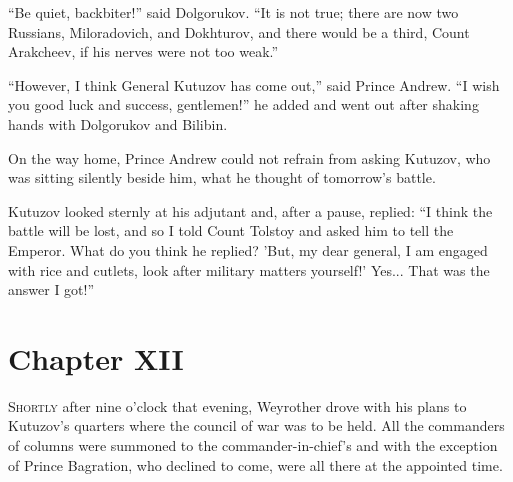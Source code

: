 ``Be quiet, backbiter!'' said Dolgorukov. ``It is not true; there
are now two Russians, Miloradovich, and Dokhturov, and there
would be a third, Count Arakcheev, if his nerves were not too
weak.''

``However, I think General Kutuzov has come out,'' said Prince
Andrew. ``I wish you good luck and success, gentlemen!'' he added
and went out after shaking hands with Dolgorukov and Bilibin.

On the way home, Prince Andrew could not refrain from asking
Kutuzov, who was sitting silently beside him, what he thought of
tomorrow's battle.

Kutuzov looked sternly at his adjutant and, after a pause,
replied: ``I think the battle will be lost, and so I told Count
Tolstoy and asked him to tell the Emperor. What do you think he
replied? 'But, my dear general, I am engaged with rice and
cutlets, look after military matters yourself!' Yes... That was
the answer I got!''


\chapter*{Chapter XII}
\ifaudio     
{} 
\fi

\lettrine[lines=2, loversize=0.3, lraise=0]{\initfamily S}{hortly }
after nine o'clock that evening, Weyrother drove with his
plans to Kutuzov's quarters where the council of war was to be
held. All the commanders of columns were summoned to the
commander-in-chief's and with the exception of Prince Bagration,
who declined to come, were all there at the appointed time.

